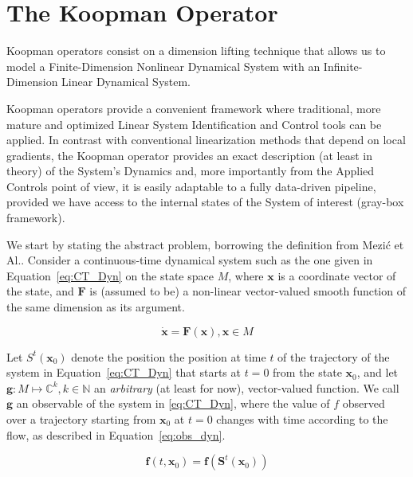 \documentclass{article}
\begin{document}
\section{The Koopman Operator}

    Koopman operators consist on a dimension lifting technique that allows us to model a Finite-Dimension Nonlinear Dynamical System with an Infinite-Dimension Linear Dynamical System.
    
    Koopman operators provide a convenient framework where traditional, more mature and optimized Linear System Identification and Control tools can be applied. In contrast with conventional linearization methods that depend on local gradients, the Koopman operator provides an exact description (at least in theory) of the System's Dynamics and, more importantly from the Applied Controls point of view, it is easily adaptable to a fully data-driven pipeline, provided we have access to the internal states of the System of interest (gray-box framework).

    We start by stating the abstract problem, borrowing the definition from
    Mezić et Al.\cite{Koopman_Basics}. Consider a continuous-time dynamical system such as the one given in Equation~\ref{eq:CT_Dyn} on the state space $M$, where $\mathbf{x}$ is a coordinate vector of the state, and $\textbf{F}$ is (assumed to be) a non-linear vector-valued smooth function of the same dimension as its argument.

    \begin{equation} \label{eq:CT_Dyn}
        \mathbf{\dot{x}} = \mathbf{F}\left( \mathbf{x} \right) , \mathbf{x} \in M
    \end{equation}
    
    Let $S^t(\mathbf{x}_0)$ denote the position the position at time $t$ of the trajectory of the system in Equation~\ref{eq:CT_Dyn} that starts at $t=0$ from the state $\mathbf{x}_0$, and let $\mathbf{g}:M \mapsto \mathbb{C}^k,k \in \mathbb{N}$ an \textit{arbitrary} (at least for now), vector-valued function. We call $\mathbf{g}$ an observable of the system in \ref{eq:CT_Dyn}, where the value of $f$ observed over a trajectory starting from $\mathbf{x}_0$ at $t=0$ changes with time according to the flow, as described in Equation~\ref{eq:obs_dyn}.

    \begin{equation} \label{eq:obs_dyn}
        \mathbf{f}\left(t,\mathbf{x}_0\right) = \mathbf{f} \left(\mathbf{S}^t\left(\mathbf{x}_0\right)\right)
    \end{equation}
    
\end{document}

